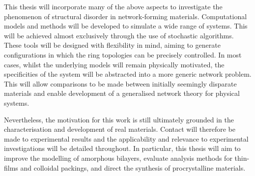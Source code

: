 This thesis will incorporate many of the above aspects to investigate the phenomenon of structural disorder in \td{} network\--forming materials.
Computational models and methods will be developed to simulate a wide range of \td{} systems.
This will be achieved almost exclusively through the use of stochastic \mc{} algorithms.
These tools will be designed with flexibility in mind, aiming to generate configurations in which the ring topologies can be precisely controlled.
In most cases, whilst the underlying models will remain physically motivated, the specificities of the system will be abstracted into a more generic network problem.
This will allow comparisons to be made between initially seemingly disparate materials and enable development of a generalised network theory for physical \td{} systems.

Nevertheless, the motivation for this work is still ultimately grounded in the characterisation and development of real materials.
Contact will therefore be made to experimental results and the applicability and relevance to experimental investigations will be detailed throughout.
In particular, this thesis will aim to improve the modelling of amorphous bilayers, evaluate analysis methods for thin\--films and colloidal packings, and direct the synthesis of procrystalline materials.  

 
